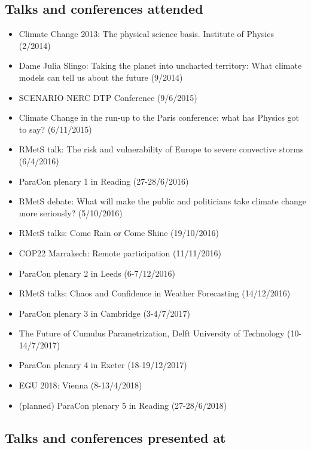 \documentclass[11pt,a4paper]{article}
\begin{document}
\subsection*{Talks and conferences attended}

\begin{itemize}
  \item Climate Change 2013: The physical science basis. Institute of Physics (2/2014)
  \item Dame Julia Slingo: Taking the planet into uncharted territory: What climate models can tell us about the future (9/2014)
  \item SCENARIO NERC DTP Conference (9/6/2015)
  \item Climate Change in the run-up to the Paris conference: what has Physics got to say? (6/11/2015)
  \item RMetS talk: The risk and vulnerability of Europe to severe convective storms (6/4/2016)
  \item ParaCon plenary 1 in Reading (27-28/6/2016)
  \item RMetS debate: What will make the public and politicians take climate change more seriously? (5/10/2016)
  \item RMetS talks: Come Rain or Come Shine (19/10/2016)
  \item COP22 Marrakech: Remote participation (11/11/2016)
  \item ParaCon plenary 2 in Leeds (6-7/12/2016)
  \item RMetS talks: Chaos and Confidence in Weather Forecasting (14/12/2016)
  \item ParaCon plenary 3 in Cambridge (3-4/7/2017)
  \item The Future of Cumulus Parametrization, Delft University of Technology (10-14/7/2017)
  \item ParaCon plenary 4 in Exeter (18-19/12/2017)
  \item EGU 2018: Vienna (8-13/4/2018)
  \item (planned) ParaCon plenary 5 in Reading (27-28/6/2018)
\end{itemize}

\subsection*{Talks and conferences presented at}
\end{document}
